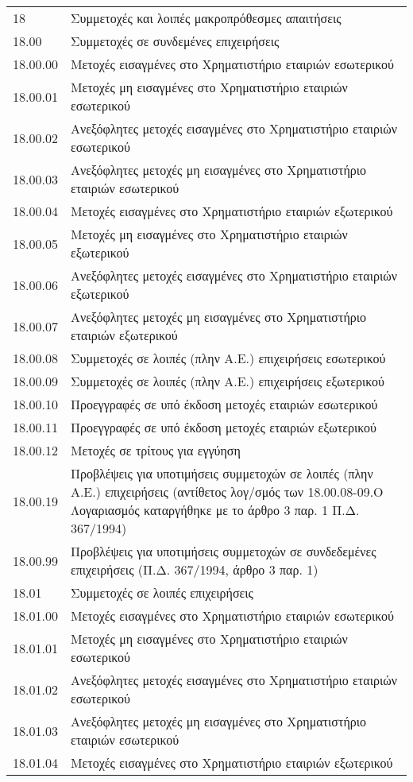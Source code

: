 \documentclass[A4,10pt,greek]{book}
\begin{document}
\begin{tabularx}{\linewidth}{lX}
18 & Συμμετοχές και λοιπές μακροπρόθεσμες απαιτήσεις\\
18.00 & Συμμετοχές σε συνδεμένες επιχειρήσεις\\
18.00.00 & Μετοχές εισαγμένες στο Χρηματιστήριο εταιριών εσωτερικού\\
18.00.01 & Μετοχές μη εισαγμένες στο Χρηματιστήριο εταιριών εσωτερικού\\
18.00.02 & Ανεξόφλητες μετοχές εισαγμένες στο Χρηματιστήριο εταιριών εσωτερικού\\
18.00.03 & Ανεξόφλητες μετοχές μη εισαγμένες στο Χρηματιστήριο εταιριών εσωτερικού\\
18.00.04 & Μετοχές εισαγμένες στο Χρηματιστήριο εταιριών εξωτερικού\\
18.00.05 & Μετοχές μη εισαγμένες στο Χρηματιστήριο εταιριών εξωτερικού\\
18.00.06 & Ανεξόφλητες μετοχές εισαγμένες στο Χρηματιστήριο εταιριών εξωτερικού\\
18.00.07 & Ανεξόφλητες μετοχές μη εισαγμένες στο Χρηματιστήριο εταιριών εξωτερικού\\
18.00.08 & Συμμετοχές σε λοιπές (πλην Α.Ε.) επιχειρήσεις εσωτερικού\\
18.00.09 & Συμμετοχές σε λοιπές (πλην Α.Ε.) επιχειρήσεις εξωτερικού\\
18.00.10 & Προεγγραφές σε υπό έκδοση μετοχές εταιριών εσωτερικού\\
18.00.11 & Προεγγραφές σε υπό έκδοση μετοχές εταιριών εξωτερικού\\
18.00.12 & Μετοχές σε τρίτους για εγγύηση\\
18.00.19 & Προβλέψεις για υποτιμήσεις συμμετοχών σε λοιπές (πλην Α.Ε.) επιχειρήσεις (αντίθετος λογ/σμός των 18.00.08-09.Ο Λογαριασμός καταργήθηκε με το άρθρο 3 παρ. 1 Π.Δ. 367/1994)\\
18.00.99 & Προβλέψεις για υποτιμήσεις συμμετοχών σε συνδεδεμένες  επιχειρήσεις (Π.Δ. 367/1994, άρθρο 3 παρ. 1)\\
18.01 & Συμμετοχές σε λοιπές επιχειρήσεις\\
18.01.00 & Μετοχές εισαγμένες στο Χρηματιστήριο εταιριών εσωτερικού\\
18.01.01 & Μετοχές μη εισαγμένες στο Χρηματιστήριο εταιριών  εσωτερικού\\
18.01.02 & Ανεξόφλητες μετοχές εισαγμένες στο Χρηματιστήριο εταιριών εσωτερικού\\
18.01.03 & Ανεξόφλητες μετοχές μη εισαγμένες στο Χρηματιστήριο εταιριών εσωτερικού\\
18.01.04 & Μετοχές εισαγμένες στο Χρηματιστήριο εταιριών εξωτερικού\\

\end{tabularx}
\end{document}
